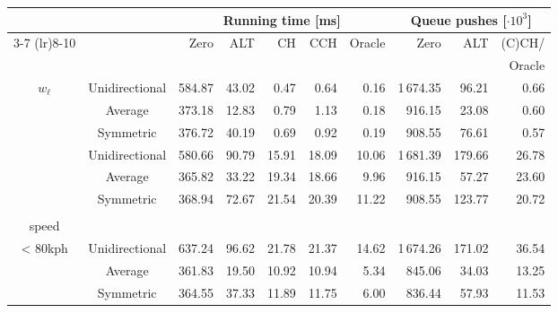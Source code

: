 \begin{tabular}{ccrrrrrrrr}
\toprule
 &  & \multicolumn{5}{c}{Running time [ms]} & \multicolumn{3}{c}{Queue pushes [$\cdot 10^3$]} \\ \cmidrule(lr){3-7} \cmidrule(lr){8-10}\multirow{2}{*}{$w_q$} & & \multirow{2}{*}{Zero} & \multirow{2}{*}{ALT} & \multirow{2}{*}{CH} & \multirow{2}{*}{CCH} & \multirow{2}{*}{Oracle} & \multirow{2}{*}{Zero} & \multirow{2}{*}{ALT} & (C)CH/ \\
 & & & & & & & & & Oracle \\
\midrule
\multirow{3}{*}{$w_{\ell}$} & Unidirectional &            584.87 & 43.02 &  0.47 &  0.64 &   0.16 &                    1\,674.35 &  96.21 &         0.66 \\
        & Average &            373.18 & 12.83 &  0.79 &  1.13 &   0.18 &                     916.15 &  23.08 &         0.60 \\
        & Symmetric &            376.72 & 40.19 &  0.69 &  0.92 &   0.19 &                     908.55 &  76.61 &         0.57 \\
\addlinespace
\multirow{3}{*}{$w_{\ell} \cdot 1.05$} & Unidirectional &            580.66 & 90.79 & 15.91 & 18.09 &  10.06 &                    1\,681.39 & 179.66 &        26.78 \\
        & Average &            365.82 & 33.22 & 19.34 & 18.66 &   9.96 &                     916.15 &  57.27 &        23.60 \\
        & Symmetric &            368.94 & 72.67 & 21.54 & 20.39 &  11.22 &                     908.55 & 123.77 &        20.72 \\
\addlinespace
\multirow{3}{*}{\shortstack{$w_{\ell} \cdot 1.5$ if\\ speed \\< 80kph}} & Unidirectional &            637.24 & 96.62 & 21.78 & 21.37 &  14.62 &                    1\,674.26 & 171.02 &        36.54 \\
        & Average &            361.83 & 19.50 & 10.92 & 10.94 &   5.34 &                     845.06 &  34.03 &        13.25 \\
        & Symmetric &            364.55 & 37.33 & 11.89 & 11.75 &   6.00 &                     836.44 &  57.93 &        11.53 \\
\bottomrule
\end{tabular}


